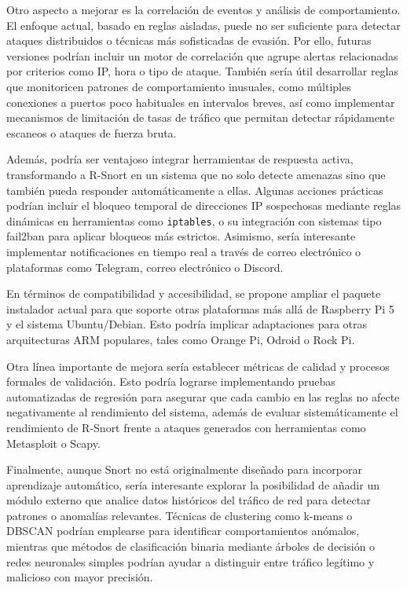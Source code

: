 \documentclass[11pt,a4paper,twoside]{report}
\begin{document}
Otro aspecto a mejorar es la correlación de eventos y análisis de comportamiento. El enfoque actual, basado en reglas aisladas, puede no ser suficiente para detectar ataques distribuidos o técnicas más sofisticadas de evasión. Por ello, futuras versiones podrían incluir un motor de correlación que agrupe alertas relacionadas por criterios como IP, hora o tipo de ataque. También sería útil desarrollar reglas que monitoricen patrones de comportamiento inusuales, como múltiples conexiones a puertos poco habituales en intervalos breves, así como implementar mecanismos de limitación de tasas de tráfico que permitan detectar rápidamente escaneos o ataques de fuerza bruta.\newline

Además, podría ser ventajoso integrar herramientas de respuesta activa, transformando a R-Snort en un sistema que no solo detecte amenazas sino que también pueda responder automáticamente a ellas. Algunas acciones prácticas podrían incluir el bloqueo temporal de direcciones IP sospechosas mediante reglas dinámicas en herramientas como \texttt{iptables}, o su integración con sistemas tipo fail2ban para aplicar bloqueos más estrictos. Asimismo, sería interesante implementar notificaciones en tiempo real a través de correo electrónico o plataformas como Telegram, correo electrónico o Discord.\newline

En términos de compatibilidad y accesibilidad, se propone ampliar el paquete instalador actual para que soporte otras plataformas más allá de Raspberry Pi 5 y el sistema Ubuntu/Debian. Esto podría implicar adaptaciones para otras arquitecturas ARM populares, tales como Orange Pi, Odroid o Rock Pi.\newline

Otra línea importante de mejora sería establecer métricas de calidad y procesos formales de validación. Esto podría lograrse implementando pruebas automatizadas de regresión para asegurar que cada cambio en las reglas no afecte negativamente al rendimiento del sistema, además de evaluar sistemáticamente el rendimiento de R-Snort frente a ataques generados con herramientas como Metasploit o Scapy.\newline

Finalmente, aunque Snort no está originalmente diseñado para incorporar aprendizaje automático, sería interesante explorar la posibilidad de añadir un módulo externo que analice datos históricos del tráfico de red para detectar patrones o anomalías relevantes. Técnicas de clustering como k-means o DBSCAN podrían emplearse para identificar comportamientos anómalos, mientras que métodos de clasificación binaria mediante árboles de decisión o redes neuronales simples podrían ayudar a distinguir entre tráfico legítimo y malicioso con mayor precisión.\newline
\end{document}
